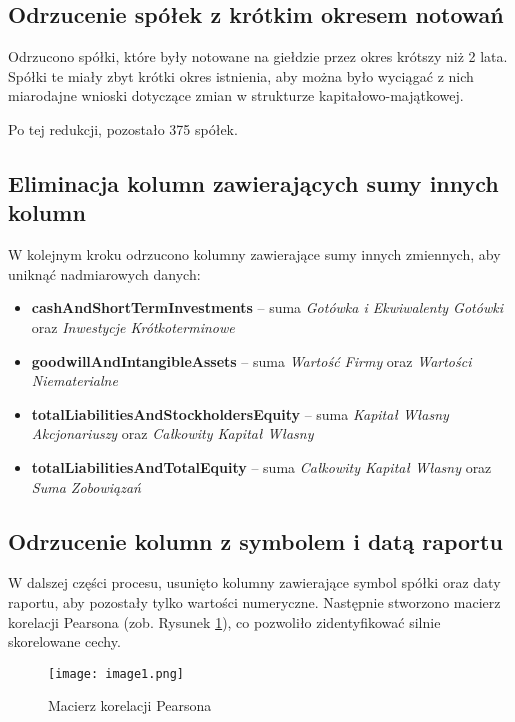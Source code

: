 \documentclass[12pt]{article}
\begin{document}
\subsection{Odrzucenie spółek z krótkim okresem notowań}

Odrzucono spółki, które były notowane na giełdzie przez okres krótszy niż 2 lata. Spółki te miały zbyt krótki okres istnienia, aby można było wyciągać z nich miarodajne wnioski dotyczące zmian w strukturze kapitałowo-majątkowej.

Po tej redukcji, pozostało 375 spółek.

\subsection{Eliminacja kolumn zawierających sumy innych kolumn}

W kolejnym kroku odrzucono kolumny zawierające sumy innych zmiennych, aby uniknąć nadmiarowych danych:
\begin{itemize}
    \item \textbf{cashAndShortTermInvestments} – suma \emph{Gotówka i Ekwiwalenty Gotówki} oraz \emph{Inwestycje Krótkoterminowe}
    \item \textbf{goodwillAndIntangibleAssets} – suma \emph{Wartość Firmy} oraz \emph{Wartości Niematerialne}
    \item \textbf{totalLiabilitiesAndStockholdersEquity} – suma \emph{Kapitał Własny Akcjonariuszy} oraz \emph{Całkowity Kapitał Własny}
    \item \textbf{totalLiabilitiesAndTotalEquity} – suma \emph{Całkowity Kapitał Własny} oraz \emph{Suma Zobowiązań}
\end{itemize}

\subsection{Odrzucenie kolumn z symbolem i datą raportu}

W dalszej części procesu, usunięto kolumny zawierające symbol spółki oraz daty raportu, aby pozostały tylko wartości numeryczne. Następnie stworzono macierz korelacji Pearsona (zob. Rysunek \ref{fig:pearson_corr}), co pozwoliło zidentyfikować silnie skorelowane cechy.

\begin{figure}[h]
    \centering
    \texttt{[image: image1.png]}
    \caption{Macierz korelacji Pearsona}
    \label{fig:pearson_corr}
\end{figure}
\end{document}
